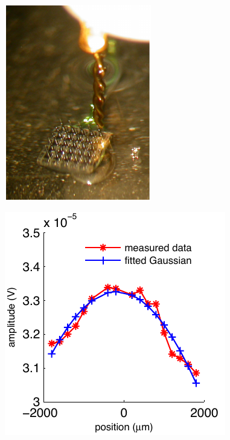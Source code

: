 \documentclass[review,authoryear,3p]{elsarticle}
\begin{document}
\clearpage
\newpage
\begin{figure}[!ht]
\begin{center}
\includegraphics{./Graph/pdf/fig13.pdf}
\end{center}
\caption{}
\label{fig:SensorAndSource}
\end{figure}
\clearpage
\newpage
\begin{figure}[!ht]
\begin{center}
\includegraphics{./Graph/pdf/fig14.pdf}
\end{center}
\caption{}
\label{fig:Ch3}
\end{figure}
\clearpage
\newpage
\end{document}
